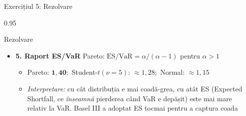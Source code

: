 \documentclass[9pt, aspectratio=169, t]{beamer}
\begin{document}
\begin{frame}[shrink=25]{Exercițiul 5: Rezolvare}
\begin{cminipage}{0.95\textwidth}
\begin{exampleblock}{Rezolvare}
\begin{itemize}
    \item \textbf{5. Raport ES/VaR} \quad Pareto: $\text{ES}/\text{VaR} = \alpha/(\alpha-1)$ pentru $\alpha > 1$
    \begin{itemize}\setlength{\itemsep}{0pt}
        \item Pareto: $\mathbf{1{,}40}$;\ Student-$t(\nu=5)$: $\approx 1{,}28$;\ Normal: $\approx 1{,}15$
        \item \textit{Interpretare:} cu cât distribuția e mai coadă-grea, cu atât ES (Expected Shortfall, ce \emph{înseamnă} pierderea când VaR e depășit) este mai mare relativ la VaR. Basel III a adoptat ES tocmai pentru a captura coada
    \end{itemize}
\end{itemize}
\end{exampleblock}
\end{cminipage}
\end{frame}
\end{document}

